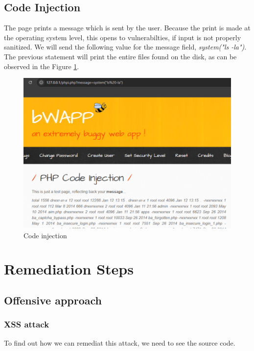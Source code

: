 \documentclass{article}
\begin{document}
\subsection{Code Injection}
The page prints a message which is sent by the user. Because the print is made at the operating system level, this opens to vulnerabilties, if input is not properly sanitized. We will send the following value for the message field, \textit{system("ls -la")}. The previous statement will print the entire files found on the disk, as can be observed in the Figure \ref{fig:defensive-code-injection}.
\begin{figure}[H]
    \centering
    \includegraphics[width=0.5\linewidth]{Figures/defensive/code-injection.PNG}
    \caption{Code injection}
    \label{fig:defensive-code-injection}
\end{figure}
\section{Remediation Steps}
\label{}

\subsection{Offensive approach}

\subsubsection{XSS attack}
\label{xss-attack}
To find out how we can remediat this attack, we need to see the source code.
\end{document}
